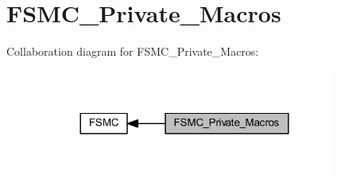 \hypertarget{group___f_s_m_c___private___macros}{}\section{F\+S\+M\+C\+\_\+\+Private\+\_\+\+Macros}
\label{group___f_s_m_c___private___macros}
Collaboration diagram for F\+S\+M\+C\+\_\+\+Private\+\_\+\+Macros\+:
\nopagebreak
\begin{figure}[H]
\begin{center}
\leavevmode
\includegraphics[width=276pt]{group___f_s_m_c___private___macros}
\end{center}
\end{figure}
